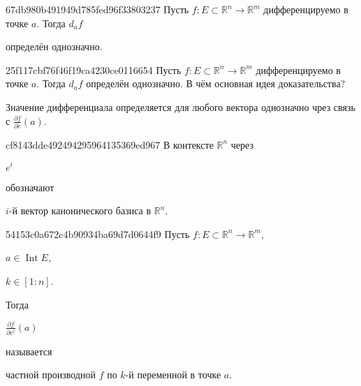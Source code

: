 \begin{note}{67db980b491949d785fed96f33803237}
    Пусть \({ f : E \subset \mathbb R^{n} \to \mathbb R^{m} }\) дифференцируемо в точке \({ a }\).
    Тогда \({ d_{a}f }\) \begin{icloze}{1}определён однозначно.\end{icloze}
\end{note}

\begin{note}{25f117cbf76f46f19ca4230ce0116654}
    Пусть \({ f : E \subset \mathbb R^{n} \to \mathbb R^{m} }\) дифференцируемо в точке \({ a }\).
    Тогда \({ d_{a}f }\) определён однозначно.
    В чём основная идея доказательства?

    \begin{cloze}{1}
        Значение дифференциала определяется для любого вектора однозначно чрез связь с \({ \frac{\partial f}{\partial e}(a) }\).
    \end{cloze}
\end{note}

\begin{note}{cf8143dde492494295964135369ed967}
    В контексте \({ \mathbb R^{n} }\) через \begin{icloze}{2}\({ e^{i} }\)\end{icloze} обозначают \begin{icloze}{1}\({ i }\)-й вектор канонического базиса в \({ \mathbb R^{n} }\).\end{icloze}
\end{note}

\begin{note}{54153c0a672c4b90934ba69d7d0644f9}
    Пусть \({ f : E \subset \mathbb R^{n} \to \mathbb R^{m} }\),\: \begin{icloze}{4}\({ a \in \operatorname{Int} E }\),\end{icloze}\: \begin{icloze}{3}\({ k \in [1 : n] }\).\end{icloze}
    Тогда \begin{icloze}{2}\({ \frac{\partial f}{\partial e^{i}}(a) }\)\end{icloze} называется \begin{icloze}{1}частной производной \({ f }\) по \({ k }\)-й переменной в точке \({ a }\).\end{icloze}
\end{note}


